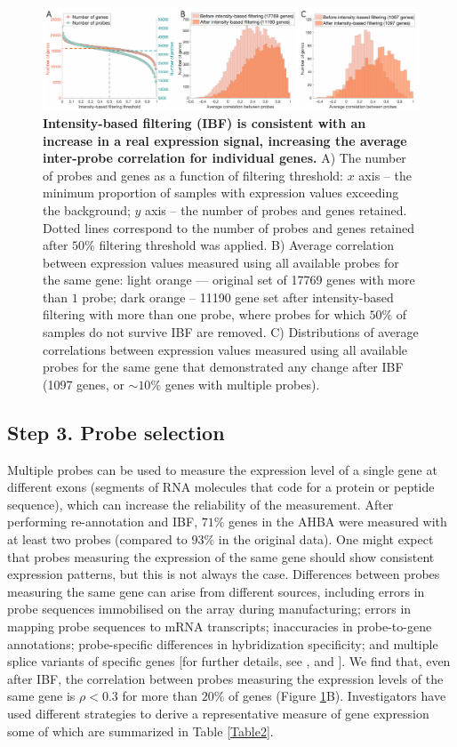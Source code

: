 \begin{figure}[h!]
  \centering
    \includegraphics[width=1\textwidth]{Chapter4/Ch4Fig3.pdf}
\caption{\textbf{Intensity-based filtering (IBF) is consistent with an increase in a real expression signal, increasing the average inter-probe correlation for individual genes.} A) The number of probes and genes as a function of filtering threshold: $x$ axis – the minimum proportion of samples with expression values exceeding the background; $y$ axis – the number of probes and genes retained. Dotted lines correspond to the number of probes and genes retained after $50\%$ filtering threshold was applied.
B) Average correlation between expression values measured using all available probes for the same gene: light orange --- original set of \num{17769} genes with more than $1$ probe; dark orange – \num{11190} gene set after intensity-based filtering with more than one probe, where probes for which $50\%$ of samples do not survive IBF are removed.
C) Distributions of average correlations between expression values measured using all available probes for the same gene that demonstrated any change after IBF (\num{1097} genes, or $\sim10\%$ genes with multiple probes). }

\label{fig:Ch4Fig3}
\end{figure}

\subsection{Step 3. Probe selection}

Multiple probes can be used to measure the expression level of a single gene at different exons (segments of RNA molecules that code for a protein or peptide sequence), which can increase the reliability of the measurement. After performing re-annotation and IBF, $71\%$ genes in the AHBA were measured with at least two probes (compared to $93\%$ in the original data). One might expect that probes measuring the expression of the same gene should show consistent expression patterns, but this is not always the case. Differences between probes measuring the same gene can arise from different sources, including errors in probe sequences immobilised on the array during manufacturing; errors in mapping probe sequences to mRNA transcripts; inaccuracies in probe-to-gene annotations; probe-specific differences in hybridization specificity; and multiple splice variants of specific genes [for further details, see \citet{Liu2010}, and \citep{Jaksik2015}]. We find that, even after IBF, the correlation between probes measuring the expression levels of the same gene is $\rho < 0.3$ for more than $20\%$ of genes (Figure \ref{fig:Ch4Fig3}B). Investigators have used different strategies to derive a representative measure of gene expression some of which are summarized in Table \ref{Table2}.


